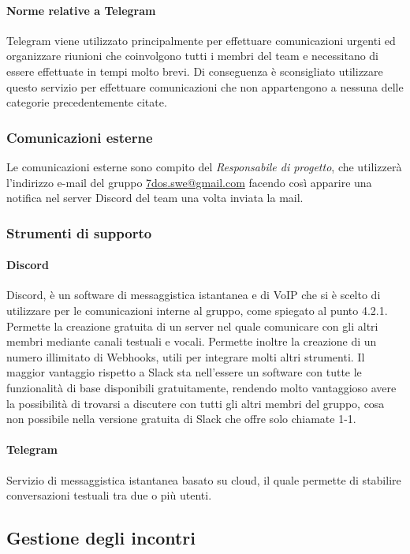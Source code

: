\paragraph{Norme relative a Telegram}\Spazio
 Telegram viene utilizzato principalmente per effettuare comunicazioni urgenti ed organizzare riunioni che coinvolgono tutti i membri del team e necessitano di essere effettuate in tempi molto brevi. Di conseguenza è sconsigliato utilizzare questo servizio per effettuare comunicazioni che non appartengono a nessuna delle categorie precedentemente citate.

\subsubsection{Comunicazioni esterne}
Le comunicazioni esterne sono compito del \emph{Responsabile di progetto}, che utilizzerà l'indirizzo e-mail del gruppo \href{mailto:7dos.swe@gmail.com}{7dos.swe@gmail.com} facendo così apparire una notifica nel server Discord del team una volta inviata la mail.
\subsubsection{Strumenti di supporto}
\paragraph{Discord}\Spazio
Discord, è un software di messaggistica istantanea e di VoIP che si è scelto di utilizzare per le comunicazioni interne al gruppo, come spiegato al punto 4.2.1. Permette la creazione gratuita di un server nel quale comunicare con gli altri membri mediante canali testuali e vocali. Permette inoltre la creazione di un numero illimitato di Webhooks, utili per integrare molti altri strumenti.
Il maggior vantaggio rispetto a Slack sta nell'essere un software con tutte le funzionalità di base disponibili gratuitamente, rendendo molto vantaggioso avere la possibilità di trovarsi a discutere con tutti gli altri membri del gruppo, cosa non possibile nella versione gratuita di Slack che offre solo chiamate 1-1.
\paragraph{Telegram}\Spazio
Servizio di messaggistica istantanea basato su cloud, il quale permette di stabilire conversazioni testuali tra due o più utenti.
\subsection{Gestione degli incontri}
